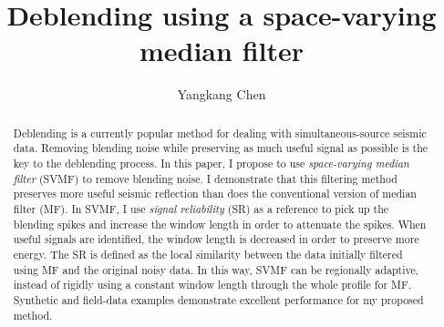 
\title{Deblending using a space-varying median filter}
\renewcommand{\thefootnote}{\fnsymbol{footnote}}

\author{Yangkang Chen}

\address{
\footnotemark[1]Bureau of Economic Geology, \\
Jackson School of Geosciences \\
The University of Texas at Austin \\
University Station, Box X \\
Austin, TX 78713-8924 \\
USA \\
}


\maketitle

\begin{abstract}
Deblending is a currently popular method for dealing with simultaneous-source seismic data. Removing blending noise while preserving as much useful signal as possible is the key to the deblending process. In this paper, I propose to use \emph{space-varying median filter} (SVMF) to remove blending noise. I demonstrate that this filtering method preserves more useful seismic reflection than does the conventional version of median filter (MF). In SVMF, I use \emph{signal reliability} (SR) as a reference to pick up the blending spikes and increase the window length in order to attenuate the spikes. When useful signals are identified, the window length is decreased in order to preserve more energy. The SR is defined as the local similarity between the data initially filtered using MF and the original noisy data. In this way, SVMF can be regionally adaptive, instead of rigidly using a constant window length through the whole profile for MF. Synthetic and field-data examples demonstrate excellent performance for my proposed method.
\end{abstract}



